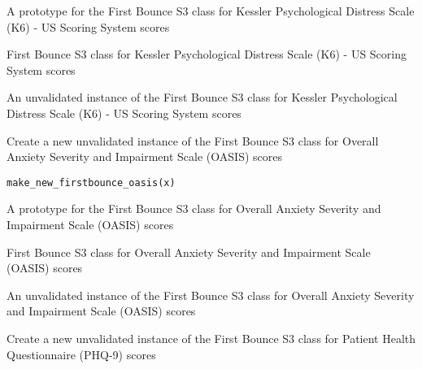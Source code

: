\documentclass[a4paper]{book}
\begin{document}
%
\begin{Arguments}
\begin{ldescription}
\item[\code{x}] A prototype for the First Bounce S3 class for Kessler Psychological Distress Scale (K6) - US Scoring System scores
\end{ldescription}
\end{Arguments}
%
\begin{Details}\relax
First Bounce S3 class for Kessler Psychological Distress Scale (K6) - US Scoring System scores
\end{Details}
%
\begin{Value}
An unvalidated instance of the First Bounce S3 class for Kessler Psychological Distress Scale (K6) - US Scoring System scores
\end{Value}
%
\begin{Description}\relax
Create a new unvalidated instance of the First Bounce S3 class for Overall Anxiety Severity and Impairment Scale (OASIS) scores
\end{Description}
%
\begin{Usage}
\begin{verbatim}
make_new_firstbounce_oasis(x)
\end{verbatim}
\end{Usage}
%
\begin{Arguments}
\begin{ldescription}
\item[\code{x}] A prototype for the First Bounce S3 class for Overall Anxiety Severity and Impairment Scale (OASIS) scores
\end{ldescription}
\end{Arguments}
%
\begin{Details}\relax
First Bounce S3 class for Overall Anxiety Severity and Impairment Scale (OASIS) scores
\end{Details}
%
\begin{Value}
An unvalidated instance of the First Bounce S3 class for Overall Anxiety Severity and Impairment Scale (OASIS) scores
\end{Value}
%
\begin{Description}\relax
Create a new unvalidated instance of the First Bounce S3 class for Patient Health Questionnaire (PHQ-9) scores
\end{Description}
\end{document}
